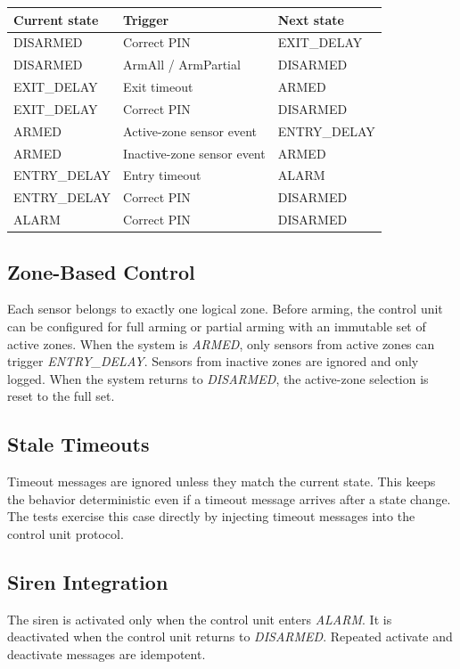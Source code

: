 \begin{center}
\begin{tabular}{|l|l|l|}
\hline
Current state & Trigger & Next state \\
\hline
DISARMED & Correct PIN & EXIT\_DELAY \\
DISARMED & ArmAll / ArmPartial & DISARMED \\
EXIT\_DELAY & Exit timeout & ARMED \\
EXIT\_DELAY & Correct PIN & DISARMED \\
ARMED & Active-zone sensor event & ENTRY\_DELAY \\
ARMED & Inactive-zone sensor event & ARMED \\
ENTRY\_DELAY & Entry timeout & ALARM \\
ENTRY\_DELAY & Correct PIN & DISARMED \\
ALARM & Correct PIN & DISARMED \\
\hline
\end{tabular}
\end{center}

\subsection{Zone-Based Control}
Each sensor belongs to exactly one logical zone.
Before arming, the control unit can be configured for full arming or partial arming with an immutable set of active zones.
When the system is \textit{ARMED}, only sensors from active zones can trigger \textit{ENTRY\_DELAY}.
Sensors from inactive zones are ignored and only logged.
When the system returns to \textit{DISARMED}, the active-zone selection is reset to the full set.

\subsection{Stale Timeouts}
Timeout messages are ignored unless they match the current state.
This keeps the behavior deterministic even if a timeout message arrives after a state change.
The tests exercise this case directly by injecting timeout messages into the control unit protocol.

\subsection{Siren Integration}
The siren is activated only when the control unit enters \textit{ALARM}.
It is deactivated when the control unit returns to \textit{DISARMED}.
Repeated activate and deactivate messages are idempotent.

